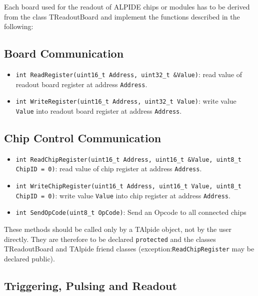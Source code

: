 \documentclass{article}
\begin{document}
Each board used for the readout of ALPIDE chips or modules has to be
derived from the class TReadoutBoard and implement the functions
described in the following: 


\subsection{Board Communication}

\begin{itemize}
\item \texttt{int ReadRegister(uint16\_t Address, uint32\_t \&Value)}:
  \newline read value of readout board register at address \texttt{Address}.
\item \texttt{int WriteRegister(uint16\_t Address, uint32\_t Value)}:
  \newline write value \texttt{Value} into readout board register at address
\texttt{Address}.
\end{itemize}



\subsection{Chip Control Communication}

\begin{itemize}
\item \texttt{int ReadChipRegister(uint16\_t Address, uint16\_t \&Value, uint8\_t ChipID = 0)}: \newline read value of chip register at address \texttt{Address}.
\item \texttt{int WriteChipRegister(uint16\_t Address, uint16\_t Value, uint8\_t ChipID = 0)}: \newline write value \texttt{Value} into chip register at address
\texttt{Address}.
\item \texttt{int SendOpCode(uint8\_t OpCode)}: \newline Send an Opcode to all connected chips
\end{itemize}

These methods should be called only by a TAlpide object, not by the
user directly. They are therefore to be declared \texttt{protected} and
the classes TReadoutBoard and TAlpide friend classes
(exception:\texttt{ReadChipRegister} may be declared public). 

\subsection{Triggering, Pulsing and Readout}
\end{document}
